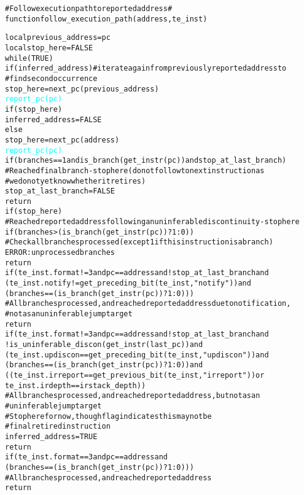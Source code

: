 \pagebreak

\begin{alltt}
# Follow execution path to reported address #
function follow_execution_path(address, te_inst)

  local previous_address = pc
  local stop_here        = FALSE
  while (TRUE)
    if (inferred_address) # iterate again from previously reported address to
                          #   find second occurrence
      stop_here = next_pc(previous_address)
      \textcolor{cyan}{report_pc(pc)}
      if (stop_here)
        inferred_address = FALSE
    else
      stop_here = next_pc(address)
      \textcolor{cyan}{report_pc(pc)}
      if (branches == 1 and is_branch(get_instr(pc)) and stop_at_last_branch)
        # Reached final branch - stop here (do not follow to next instruction as
        #  we do not yet know whether it retires)
        stop_at_last_branch = FALSE
        return
      if (stop_here)
        # Reached reported address following an uninferable discontinuity - stop here
        if (branches > (is_branch(get_instr(pc)) ? 1 : 0))
          # Check all branches processed (except 1 if this instruction is a branch)
          ERROR: unprocessed branches
        return
      if (te_inst.format != 3 and pc == address and !stop_at_last_branch and
        (te_inst.notify != get_preceding_bit(te_inst, "notify")) and 
        (branches == (is_branch(get_instr(pc)) ? 1 : 0)))
          # All branches processed, and reached reported address due to notification,
          # not as an uninferable jump target
        return
      if (te_inst.format != 3 and pc == address and !stop_at_last_branch and
        !is_uninferable_discon(get_instr(last_pc)) and 
        (te_inst.updiscon == get_preceding_bit(te_inst, "updiscon")) and 
        (branches == (is_branch(get_instr(pc)) ? 1 : 0)) and
        ((te_inst.irreport == get_previous_bit(te_inst, "irreport")) or 
         te_inst.irdepth == irstack_depth))
          # All branches processed, and reached reported address, but not as an
          #   uninferable jump target
          # Stop here for now, though flag indicates this may not be
          #  final retired instruction
        inferred_address = TRUE
        return
      if (te_inst.format == 3 and pc == address and
        (branches == (is_branch(get_instr(pc)) ? 1 : 0)))
        # All branches processed, and reached reported address
        return
\end{alltt}

\pagebreak

